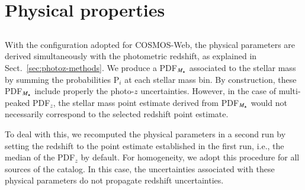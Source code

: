 \documentclass[longauth]{aa}
\begin{document}
\section{Physical properties} \label{sec:physical-prop}


\subsection{\lephare} \label{sec:physical-prop-lephare}


With the \lephare{} configuration adopted for COSMOS-Web, the physical parameters are derived simultaneously with the photometric redshift, as explained in Sect.~\ref{sec:photoz-methods}. We produce a PDF$_{M_{\star}}$ associated to the stellar mass by summing the probabilities P$_i$ at each stellar mass bin. By construction, these PDF$_{M_{\star}}$ include properly the photo-$z$ uncertainties. However, in the case of multi-peaked PDF$_z$, the stellar mass point estimate derived from PDF$_{M_{\star}}$ would not necessarily correspond to the selected redshift point estimate. 

To deal with this, we recomputed the physical parameters in a second run by setting the redshift to the point estimate established in the first run, i.e.,  the median of the PDF$_z$ by default. For homogeneity, we adopt this procedure for all sources of the catalog. In this case, the uncertainties associated with these physical parameters do not propagate redshift uncertainties.
\end{document}
